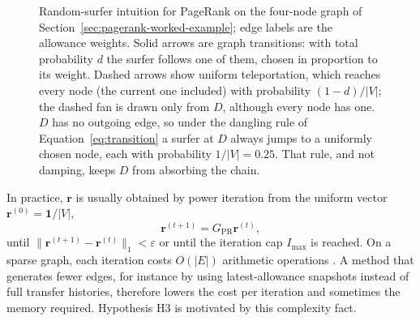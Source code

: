 \begin{figure}[htbp]
\centering
{}
\caption[{Random-surfer intuition for PageRank on the four-node graph of Section~\ref{sec:pagerank-worked-example}. Solid arrows are graph transitions, followed with total probability $d$. Dashed arrows are uniform teleportation, probability $(1-d)/n$ to every node including the current one; the dashed fan is drawn from $D$ only but leaves every node.}]{Random-surfer intuition for PageRank on the four-node graph of Section~\ref{sec:pagerank-worked-example}; edge labels are the allowance weights. Solid arrows are graph transitions: with total probability $d$ the surfer follows one of them, chosen in proportion to its weight. Dashed arrows show uniform teleportation, which reaches every node (the current one included) with probability $(1-d)/|V|$; the dashed fan is drawn only from $D$, although every node has one. $D$ has no outgoing edge, so under the dangling rule of Equation~\eqref{eq:transition} a surfer at $D$ always jumps to a uniformly chosen node, each with probability $1/|V|=0.25$. That rule, and not damping, keeps $D$ from absorbing the chain.}
\label{fig:random-surfer}
\end{figure}


In practice, $\mathbf{r}$ is usually obtained by power iteration from the uniform vector $\mathbf{r}^{(0)}=\mathbf{1}/|V|$,
\begin{equation}
\mathbf{r}^{(t+1)} = G_{\mathrm{PR}}\mathbf{r}^{(t)},
\label{eq:power-iteration}
\end{equation}
until $\|\mathbf{r}^{(t+1)}-\mathbf{r}^{(t)}\|_1 < \varepsilon$ or until the iteration cap $I_{\max}$ is reached. On a sparse graph, each iteration costs $O(|E|)$ arithmetic operations . A method that generates fewer edges, for instance by using latest-allowance snapshots instead of full transfer histories, therefore lowers the cost per iteration and sometimes the memory required. Hypothesis H3 is motivated by this complexity fact.

